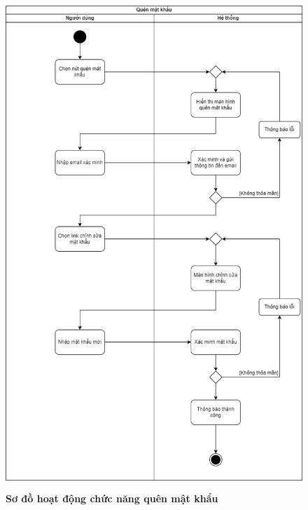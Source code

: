   \begin{figure}[H]
    \centering
    \includegraphics[width=13cm,height=18.5cm]{Images/acitivity/activity_forgot_pass.png}
    \caption[Sơ đồ hoạt động chức năng quên mật khẩu]{\bfseries \fontsize{12pt}{0pt}
    \selectfont Sơ đồ hoạt động chức năng quên mật khẩu}
    \label{activity_forgot_password} %
  \end{figure}

